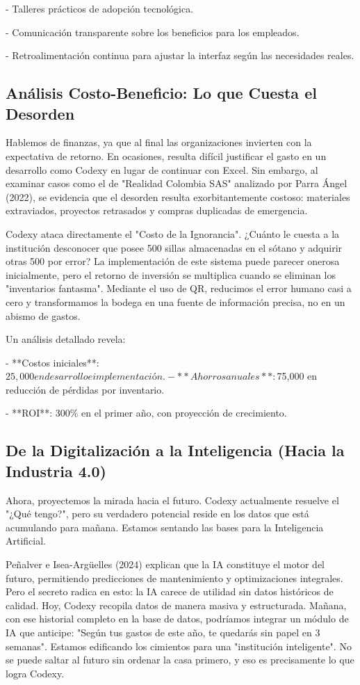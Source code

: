 - Talleres prácticos de adopción tecnológica.

- Comunicación transparente sobre los beneficios para los empleados.

- Retroalimentación continua para ajustar la interfaz según las necesidades reales.

\subsection{Análisis Costo-Beneficio: Lo que Cuesta el Desorden}

Hablemos de finanzas, ya que al final las organizaciones invierten con la expectativa de retorno. En ocasiones, resulta difícil justificar el gasto en un desarrollo como Codexy en lugar de continuar con Excel. Sin embargo, al examinar casos como el de "Realidad Colombia SAS" analizado por Parra Ángel (2022), se evidencia que el desorden resulta exorbitantemente costoso: materiales extraviados, proyectos retrasados y compras duplicadas de emergencia.

Codexy ataca directamente el "Costo de la Ignorancia". ¿Cuánto le cuesta a la institución desconocer que posee 500 sillas almacenadas en el sótano y adquirir otras 500 por error? La implementación de este sistema puede parecer onerosa inicialmente, pero el retorno de inversión se multiplica cuando se eliminan los "inventarios fantasma". Mediante el uso de QR, reducimos el error humano casi a cero y transformamos la bodega en una fuente de información precisa, no en un abismo de gastos.

Un análisis detallado revela:

- **Costos iniciales**: $25,000 en desarrollo e implementación.

- **Ahorros anuales**: $75,000 en reducción de pérdidas por inventario.

- **ROI**: 300\% en el primer año, con proyección de crecimiento.

\subsection{De la Digitalización a la Inteligencia (Hacia la Industria 4.0)}

Ahora, proyectemos la mirada hacia el futuro. Codexy actualmente resuelve el "¿Qué tengo?", pero su verdadero potencial reside en los datos que está acumulando para mañana. Estamos sentando las bases para la Inteligencia Artificial.

Peñalver e Isea-Argüelles (2024) explican que la IA constituye el motor del futuro, permitiendo predicciones de mantenimiento y optimizaciones integrales. Pero el secreto radica en esto: la IA carece de utilidad sin datos históricos de calidad. Hoy, Codexy recopila datos de manera masiva y estructurada. Mañana, con ese historial completo en la base de datos, podríamos integrar un módulo de IA que anticipe: "Según tus gastos de este año, te quedarás sin papel en 3 semanas". Estamos edificando los cimientos para una "institución inteligente". No se puede saltar al futuro sin ordenar la casa primero, y eso es precisamente lo que logra Codexy.

